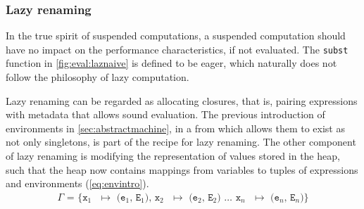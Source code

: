 

\subsubsection{Lazy renaming}
In the true spirit of suspended computations, a suspended computation should have no impact on the performance characteristics, if not evaluated.
The \texttt{subst} function in \autoref{fig:eval:laznaive} is defined to be eager, which naturally does not follow the philosophy of lazy computation.

Lazy renaming can be regarded as allocating closures, that is, pairing expressions with metadata that allows sound evaluation.
The previous introduction of environments in \autoref{sec:abstractmachine}, in a from which allows them to exist as not only singletons, is part of the recipe for lazy renaming.
The other component of lazy renaming is modifying the representation of values stored in the heap, such that the heap now contains mappings from variables to tuples of expressions and environments (\autoref{eq:envintro}).
\begin{align}
	\texttt{$\Gamma$ = \{x$_1$ $\mapsto$ (e$_1$, E$_1$), x$_2$ $\mapsto$ (e$_2$, E$_2$) $\dots$ x$_n$ $\mapsto$ (e$_n$, E$_n$)\}}\label{eq:envintro}
\end{align}


